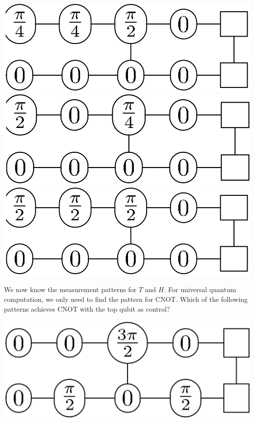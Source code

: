 \documentclass[a4paper,10pt,landscape,twocolumn]{scrartcl}
\begin{document}
\begin{exercise}
\begin{subex}
\begin{center}
			\includegraphics[]{10-practice-img5.png}\\\vspace{1em}
			\includegraphics[]{10-practice-img6.png}\qquad
			\includegraphics[]{10-practice-img7.png}
		\end{center}
	\end{subex}
	\begin{subex}
		We now know the measurement patterns for $T$ and $H$. For universal quantum computation, we only need to find the pattern for CNOT. Which of the following patterns achieves CNOT with the top qubit as control?
		\begin{center}
			\includegraphics[]{10-practice-img8.png}\qquad

\end{center}
\end{subex}
\end{exercise}
\end{document}
